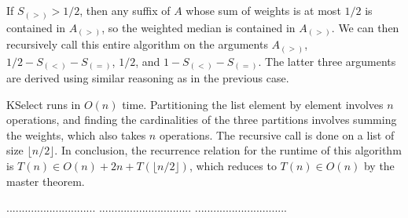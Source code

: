 \documentclass[a4paper,11pt]{article}
\begin{document}
If $S_{(>)} > 1/2$, then any suffix of $A$ whose sum of weights is at most $1/2$ is contained in $A_{(>)}$, so the weighted median is contained in $A_{(>)}$. We can then recursively call this entire algorithm on the arguments $A_{(>)}$, $1/2 - S_{(<)} - S_{(=)}$, $1/2$, and $1 - S_{(<)} - S_{(=)}$. The latter three arguments are derived using similar reasoning as in the previous case. \par
KSelect runs in $O(n)$ time. Partitioning the list element by element involves $n$ operations, and finding the cardinalities of the three partitions involves summing the weights, which also takes $n$ operations. The recursive call is done on a list of size $\lfloor{n/2}\rfloor$. In conclusion, the recurrence relation for the runtime of this algorithm is $T(n) \in O(n) + 2n + T(\lfloor{n/2}\rfloor)$, which reduces to $T(n) \in O(n)$ by the master theorem.

\pagebreak
{} $.............................$
 $..............................$
          $..............................$\\
\end{document}

